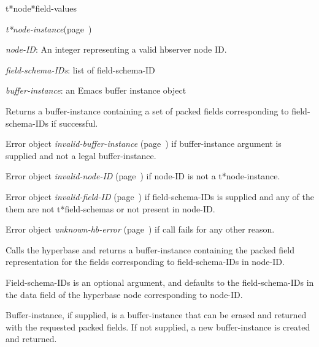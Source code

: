 \begin{description}
\item [Name:]  t*node*field-values

\item [Class:] {\sl t*node-instance}\hfill(page~\pageref{t*node-instance})

\item [Parameters:]
\item {\sl node-ID}:   An integer representing
a valid hbserver node ID.

\item {\sl field-schema-IDs}:  list of field-schema-ID

\item {\sl buffer-instance}:  an Emacs buffer instance object


\item [Return-value:]
Returns a buffer-instance containing a set of 
packed fields corresponding to field-schema-IDs
if successful.

Error object {\sl invalid-buffer-instance} (page~\pageref{invalid-buffer-instance}) if 
buffer-instance argument is supplied and not a 
legal buffer-instance.

Error object {\sl invalid-node-ID} (page~\pageref{invalid-node-ID}) if node-ID is
not a t*node-instance.

Error object {\sl invalid-field-ID} (page~\pageref{invalid-field-ID}) if
field-schema-IDs is supplied and any of the 
them are not t*field-schemas or not present in
node-ID. 

Error object {\sl unknown-hb-error} (page~\pageref{unknown-hb-error}) if call fails
for any other reason.

\item [Description:]

Calls the hyperbase and returns a buffer-instance
containing the packed field representation for the
fields corresponding to field-schema-IDs in node-ID.

Field-schema-IDs is an optional argument, and 
defaults to the field-schema-IDs in the data field
of the hyperbase node corresponding to node-ID.

Buffer-instance, if supplied, is a buffer-instance
that can be erased and returned with the requested
packed fields.  If not supplied, a new
buffer-instance is created and returned.

\item [Public:]



\end{description}
\horizontalline

